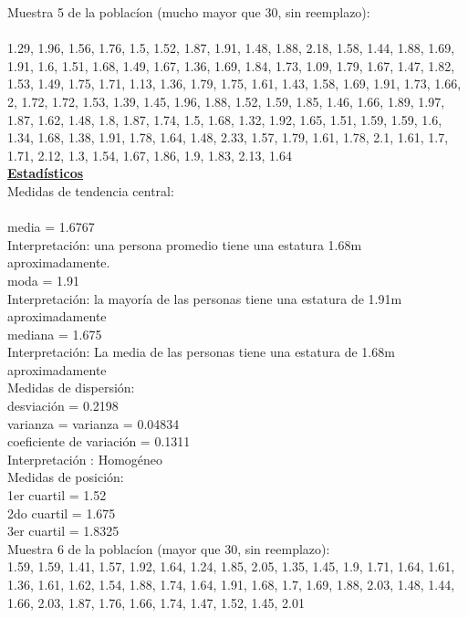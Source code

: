 \documentclass[a4paper,12pt]{article}
\begin{document}
\begin{enumerate}
Muestra 5 de la poblac\'ion (mucho mayor que 30, sin reemplazo): \\\\
1.29,	1.96,	1.56,	1.76,	1.5,    1.52,
1.87,	1.91,	1.48,	1.88,	2.18,	1.58,
1.44,	1.88,	1.69,	1.91,	1.6,    1.51,
1.68,	1.49,	1.67,	1.36,	1.69,	1.84,
1.73,	1.09,	1.79,	1.67,	1.47,	1.82,
1.53,	1.49,	1.75,	1.71,	1.13,	1.36,
1.79,	1.75,	1.61,	1.43,	1.58,	1.69,
1.91,	1.73,	1.66,	2,      1.72,	1.72,
1.53,	1.39,	1.45,	1.96,	1.88,	1.52,
1.59,	1.85,	1.46,	1.66,	1.89,	1.97,
1.87,	1.62,	1.48,	1.8,    1.87,	1.74,
1.5,    1.68,	1.32,	1.92,	1.65,	1.51,
1.59,	1.59,	1.6,    1.34,	1.68,	1.38,
1.91,	1.78,	1.64,	1.48,	2.33,	1.57,
1.79,	1.61,	1.78,	2.1,    1.61,	1.7,
1.71,	2.12,	1.3,    1.54,	1.67,	1.86,
1.9,    1.83,	2.13,	1.64\\

\textbf{\underline{Estad\'isticos}}\\

Medidas de tendencia central:\\\\
media = 1.6767\\
Interpretaci\'on: una persona promedio tiene una estatura 1.68m aproximadamente.\\
moda =  1.91\\
Interpretaci\'on: la mayor\'ia de las personas tiene una estatura de 1.91m aproximadamente\\
mediana =  1.675\\
Interpretaci\'on: La media de las personas tiene una estatura de 1.68m aproximadamente\\

Medidas de dispersi\'on:\\
desviaci\'on = 0.2198\\
varianza = varianza = 0.04834\\
coeficiente de variaci\'on = 0.1311\\
Interpretaci\'on : Homog\'eneo\\

Medidas de posici\'on:\\
1er cuartil = 1.52\\
2do cuartil = 1.675\\
3er cuartil = 1.8325\\

Muestra 6 de la poblac\'ion (mayor que 30, sin reemplazo): \\

1.59,	1.59,	1.41,	1.57,	1.92,	1.64,
1.24,	1.85,	2.05,	1.35,	1.45,	1.9,
1.71,	1.64,	1.61,	1.36,	1.61,	1.62,
1.54,	1.88,	1.74,	1.64,	1.91,	1.68,
1.7,    1.69,	1.88,	2.03,	1.48,	1.44,
1.66,	2.03,	1.87,	1.76,	1.66,	1.74,
1.47,	1.52,	1.45,	2.01\\


\end{enumerate}
\end{document}
